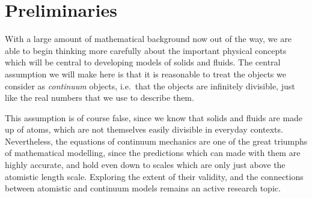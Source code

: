 \documentclass[
  letterpaper,
  DIV=11,
  numbers=noendperiod]{scrreprt}
\theoremstyle{plain}
\theoremstyle{remark}
\begin{document}
\newcommand{\bftau}{{\boldsymbol{\tau}}}
\newcommand{\bfnu}{{\boldsymbol{\nu}}}
\newcommand{\bfpsi}{{\boldsymbol{\psi}}}
\newcommand{\bfphi}{{\boldsymbol{\varphi}}}
\newcommand{\bfSigma}{{\boldsymbol{\Sigma}}}
\newcommand{\calI}{{\mathcal{I}}}
\newcommand{\calN}{{\mathcal{N}}}
\newcommand{\calV}{{\mathcal{V}}}
\newcommand{\bbE}{{\mathbb{E}}}
\newcommand{\bbR}{{\mathbb{R}}}
\newcommand{\bbC}{{\mathbb{C}}}
\newcommand{\bsfC}{{\mathsf{C}}}
\newcommand{\bsfD}{{\mathsf{D}}}
\newcommand{\bsfI}{{\mathsf{I}}}
\newcommand{\bsfO}{{\mathsf{O}}}
\newcommand{\tr}{{\operatorname{tr}}}
\newcommand{\sym}{{\operatorname{sym}}}
\newcommand{\skw}{{\operatorname{skew}}}
\newcommand{\vc}{{\operatorname{vec}}}
\newcommand{\ten}{{\operatorname{ten}}}
\newcommand{\cof}{{\operatorname{cof}}}
\newcommand{\mass}{{\operatorname{mass}}}
\newcommand{\vol}{{\operatorname{vol}}}
\newcommand{\area}{{\operatorname{area}}}
\newcommand{\com}{{\operatorname{com}}}
\newcommand{\cov}{{\operatorname{cov}}}
\newcommand{\e}{{\mathrm{e}}}
\newcommand{\D}{{\mathrm{D}}}
\newcommand{\dd}{{\mathrm{d}}}
\newcommand{\dt}{{\dd t}}
\newcommand{\Dt}{{\D t}}
\newcommand{\bigO}{{O}}
\newcommand{\litO}{{o}}
\newcommand{\dVx}{{\,\d V_{\bfx}}}
\newcommand{\dAx}{{\,\d A_{\bfx}}}
\newcommand{\dVy}{{\,\d V_{\bfy}}}
\newcommand{\dAy}{{\,\d A_{\bfy}}}
\newcommand{\ds}{{\,\d s}}

\section{Preliminaries}\label{preliminaries-2}

With a large amount of mathematical background now out of the way, we
are able to begin thinking more carefully about the important physical
concepts which will be central to developing models of solids and
fluids. The central assumption we will make here is that it is
reasonable to treat the objects we consider as \emph{continuum} objects,
i.e.~that the objects are infinitely divisible, just like the real
numbers that we use to describe them.

This assumption is of course false, since we know that solids and fluids
are made up of atoms, which are not themselves easily divisible in
everyday contexts. Nevertheless, the equations of continuum mechanics
are one of the great triumphs of mathematical modelling, since the
predictions which can made with them are highly accurate, and hold even
down to scales which are only just above the atomistic length scale.
Exploring the extent of their validity, and the connections between
atomistic and continuum models remains an active research topic.
\end{document}
